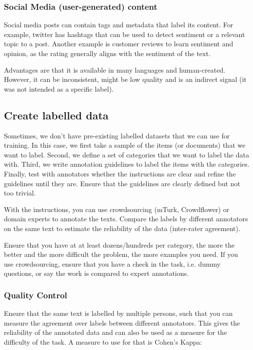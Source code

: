 \subsubsection{Social Media (user-generated) content}

Social media posts can contain tags and metadata that label its
content. For example,
twitter has hashtags that can be used to detect sentiment or a
relevant topic to a
post. Another example is customer reviews to learn sentiment and
opinion, as the rating
generally aligns with the sentiment of the text.

Advantages are that it is available in many languages and
human-created. However, it can
be inconsistent, might be low quality and is an indirect signal (it
  was not intended as
a specific label).

\subsection{Create labelled data}

Sometimes, we don't have pre-existing labelled datasets that we
can use for training. In this case, we first take a sample of
the items (or documents) that we want to label. Second, we define
a set of categories that we want to label the data with. Third, we write
annotation guidelines to label the items with the categories. Finally,
test with annotators whether the instructions are clear and refine the
guidelines until they are. Ensure that the guidelines are clearly defined
but not too trivial.

With the instructions, you can use crowdsourcing (mTurk, Crowdflower) or
domain experts to annotate the texts. Compare the labels by different
annotators on the same text to estimate the reliability of the data
(inter-rater agreement).

Ensure that you have at at least dozens/hundreds per category, the
more the better
and the more difficult the problem, the more examples you need. If
you use crowdsourcing,
ensure that you have a check in the task, i.e. dummy questions, or
say the work is compared
to expert annotations.

\subsubsection{Quality Control}

Ensure that the same text is labelled by multiple persons, such that
you can measure
the agreement over labels between different annotators. This gives
the reliability of
the annotated data and can also be used as a measure for the
difficulty of the task.
A measure to use for that is Cohen's Kappa:

